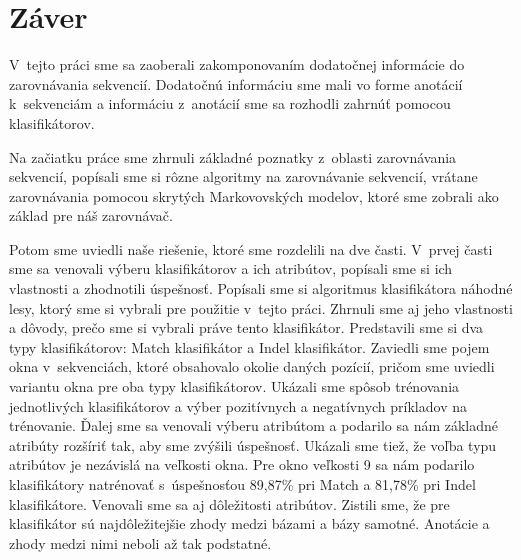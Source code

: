 \chapter*{Záver}

V~tejto práci sme sa zaoberali zakomponovaním dodatočnej informácie do zarovnávania sekvencií. Dodatočnú informáciu sme mali vo forme anotácií k~sekvenciám a informáciu z~anotácií sme sa rozhodli zahrnúť pomocou klasifikátorov.

Na začiatku práce sme zhrnuli základné poznatky z~oblasti zarovnávania sekvencií, popísali sme si rôzne algoritmy na zarovnávanie sekvencií, vrátane zarovnávania pomocou skrytých Markovovských modelov, ktoré sme zobrali ako základ pre náš zarovnávač.

Potom sme uviedli naše riešenie, ktoré sme rozdelili na dve časti.
V~prvej časti sme sa venovali výberu klasifikátorov a ich atribútov, popísali sme si ich vlastnosti a zhodnotili úspešnosť.
Popísali sme si algoritmus klasifikátora náhodné lesy, ktorý sme si vybrali pre použitie v~tejto práci. Zhrnuli sme aj jeho vlastnosti a dôvody, prečo sme si vybrali práve tento klasifikátor.
Predstavili sme si dva typy klasifikátorov: Match klasifikátor a Indel klasifikátor. Zaviedli sme pojem okna v~sekvenciách, ktoré obsahovalo okolie daných pozícií, pričom sme uviedli variantu okna pre oba typy klasifikátorov.
Ukázali sme spôsob trénovania jednotlivých klasifikátorov a výber pozitívnych a negatívnych príkladov na trénovanie.
Ďalej sme sa venovali výberu atribútom a podarilo sa nám základné atribúty rozšíriť tak, aby sme zvýšili úspešnosť. Ukázali sme tiež, že voľba typu atribútov je nezávislá na veľkosti okna. Pre okno veľkosti 9 sa nám podarilo klasifikátory natrénovať s~úspešnosťou 89,87\% pri Match a 81,78\% pri Indel klasifikátore. Venovali sme sa aj dôležitosti atribútov.
Zistili sme, že pre klasifikátor sú najdôležitejšie zhody medzi bázami a bázy samotné. Anotácie a zhody medzi nimi neboli až tak podstatné.

